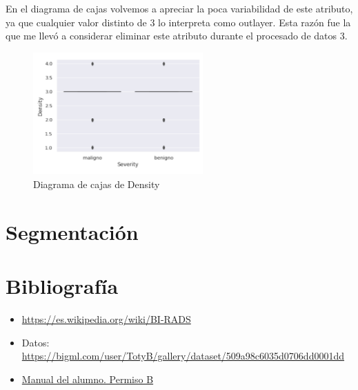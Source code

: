 \documentclass[a4]{article}
\begin{document}
En el diagrama de cajas volvemos a apreciar la poca variabilidad de este atributo, ya que cualquier valor distinto de $3$ lo interpreta como outlayer. Esta razón fue la que me llevó a considerar eliminar este atributo durante el procesado de datos $3$.

\begin{figure}[H]
  \centering
  \caption{Diagrama de cajas de Density}
  \includegraphics[width=65mm]{imagenes/bp_density}
\end{figure}

\section{Segmentación}



\section{Bibliografía}

\begin{itemize}

\item \href{https://es.wikipedia.org/wiki/BI-RADS}{https://es.wikipedia.org/wiki/BI-RADS}
\item Datos: \href{https://bigml.com/user/TotyB/gallery/dataset/509a98c6035d0706dd0001dd}{https://bigml.com/user/TotyB/gallery/dataset/509a98c6035d0706dd0001dd}
\item \href{https://www.todostuslibros.com/libros/manual-del-alumno-permiso-b-facilauto_978-84-09-08551-4}{Manual del alumno. Permiso B}
\end{itemize}
\end{document}

